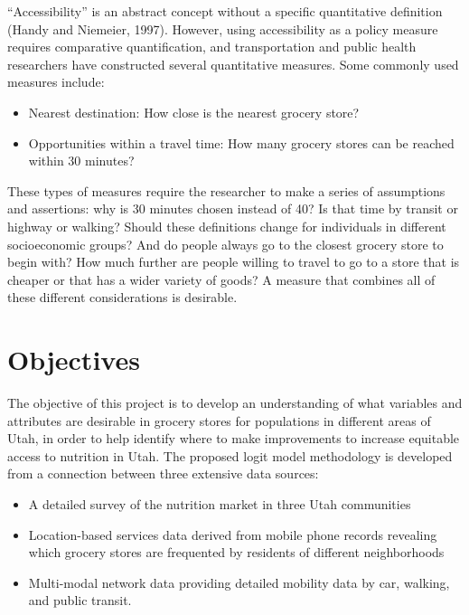 \documentclass[
  letterpaper,
  DIV=11,
  numbers=noendperiod]{scrreport}
\providecommand{\tightlist}{%
  \setlength{\itemsep}{0pt}\setlength{\parskip}{0pt}}\usepackage{longtable,booktabs,array}
\begin{document}
``Accessibility'' is an abstract concept without a specific quantitative
definition (Handy and Niemeier, 1997). However, using accessibility as a
policy measure requires comparative quantification, and transportation
and public health researchers have constructed several quantitative
measures. Some commonly used measures include:

\begin{itemize}
\tightlist
\item
  Nearest destination: How close is the nearest grocery store?
\item
  Opportunities within a travel time: How many grocery stores can be
  reached within 30 minutes?
\end{itemize}

These types of measures require the researcher to make a series of
assumptions and assertions: why is 30 minutes chosen instead of 40? Is
that time by transit or highway or walking? Should these definitions
change for individuals in different socioeconomic groups? And do people
always go to the closest grocery store to begin with? How much further
are people willing to travel to go to a store that is cheaper or that
has a wider variety of goods? A measure that combines all of these
different considerations is desirable.

\hypertarget{objectives}{%
\section{Objectives}\label{objectives}}

The objective of this project is to develop an understanding of what
variables and attributes are desirable in grocery stores for populations
in different areas of Utah, in order to help identify where to make
improvements to increase equitable access to nutrition in Utah. The
proposed logit model methodology is developed from a connection between
three extensive data sources:

\begin{itemize}
\tightlist
\item
  A detailed survey of the nutrition market in three Utah communities
\item
  Location-based services data derived from mobile phone records
  revealing which grocery stores are frequented by residents of
  different neighborhoods
\item
  Multi-modal network data providing detailed mobility data by car,
  walking, and public transit.
\end{itemize}
\end{document}
